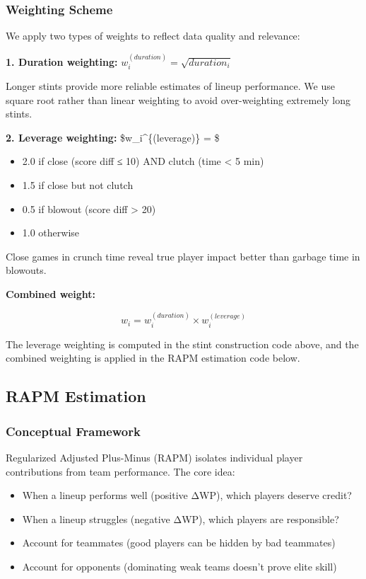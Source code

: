 \documentclass[
  letterpaper,
  DIV=11,
  numbers=noendperiod]{scrartcl}
\providecommand{\tightlist}{%
  \setlength{\itemsep}{0pt}\setlength{\parskip}{0pt}}
\begin{document}
\subsubsection{Weighting Scheme}\label{weighting-scheme}

We apply two types of weights to reflect data quality and relevance:

\textbf{1. Duration weighting:} \(w_i^{(duration)} = \sqrt{duration_i}\)

Longer stints provide more reliable estimates of lineup performance. We
use square root rather than linear weighting to avoid over-weighting
extremely long stints.

\textbf{2. Leverage weighting:} \$w\_i\^{}\{(leverage)\} = \$

\begin{itemize}
\tightlist
\item
  2.0 if close (\textbar score diff\textbar{} ≤ 10) AND clutch (time
  \textless{} 5 min)
\item
  1.5 if close but not clutch
\item
  0.5 if blowout (\textbar score diff\textbar{} \textgreater{} 20)\\
\item
  1.0 otherwise
\end{itemize}

Close games in crunch time reveal true player impact better than garbage
time in blowouts.

\textbf{Combined weight:}

\[w_i = w_i^{(duration)} \times w_i^{(leverage)}\]

The leverage weighting is computed in the stint construction code above,
and the combined weighting is applied in the RAPM estimation code below.

\subsection{RAPM Estimation}\label{rapm-estimation}

\subsubsection{Conceptual Framework}\label{conceptual-framework-1}

Regularized Adjusted Plus-Minus (RAPM) isolates individual player
contributions from team performance. The core idea:

\begin{itemize}
\tightlist
\item
  When a lineup performs well (positive ΔWP), which players deserve
  credit?
\item
  When a lineup struggles (negative ΔWP), which players are responsible?
\item
  Account for teammates (good players can be hidden by bad teammates)
\item
  Account for opponents (dominating weak teams doesn't prove elite
  skill)
\end{itemize}
\end{document}
